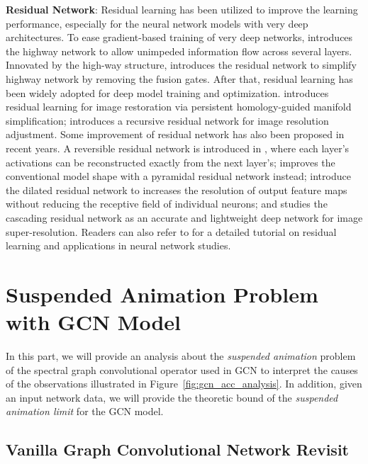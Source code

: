 \documentclass{article}
\newcommand{\gcn}{\textsc{GCN}}
\begin{document}
\noindent \textbf{Residual Network}: Residual learning \cite{SGS15, HZRS15, BYY16, HKK16, GRUG17, TYL17, YKF17, AKS18, LFMZ18, BGCDJ19} has been utilized to improve the learning performance, especially for the neural network models with very deep architectures. To ease gradient-based training of very deep networks, \cite{SGS15} introduces the highway network to allow unimpeded information flow across several layers. Innovated by the high-way structure, \cite{HZRS15} introduces the residual network to simplify highway network by removing the fusion gates. After that, residual learning has been widely adopted for deep model training and optimization. \cite{BYY16} introduces residual learning for image restoration via persistent homology-guided manifold simplification; \cite{TYL17, LFMZ18} introduces a recursive residual network for image resolution adjustment. Some improvement of residual network has also been proposed in recent years. A reversible residual network is introduced in \cite{GRUG17}, where each layer's activations can be reconstructed exactly from the next layer's; \cite{HKK16} improves the conventional model shape with a pyramidal residual network instead; \cite{YKF17} introduce the dilated residual network to increases the resolution of output feature maps without reducing the receptive field of individual neurons; and \cite{AKS18} studies the cascading residual network as an accurate and lightweight deep network for image super-resolution. Readers can also refer to \cite{residual_tutorial} for a detailed tutorial on residual learning and applications in neural network studies.
\vspace{-8pt}
\section{Suspended Animation Problem with {\gcn} Model}\label{sec:analysis}
\vspace{-8pt}

In this part, we will provide an analysis about the \textit{suspended animation} problem of the spectral graph convolutional operator used in {\gcn} to interpret the causes of the observations illustrated in Figure~\ref{fig:gcn_acc_analysis}. In addition, given an input network data, we will provide the theoretic bound of the \textit{suspended animation limit} for the {\gcn} model.

\vspace{-8pt}
\subsection{Vanilla Graph Convolutional Network Revisit}
\vspace{-8pt}
\end{document}
